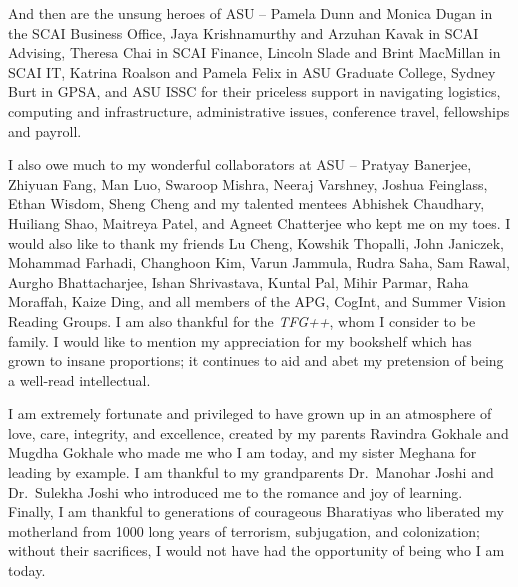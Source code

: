 {\begin{justify}
And then are the unsung heroes of ASU -- Pamela Dunn and Monica Dugan in the SCAI Business Office, Jaya Krishnamurthy and Arzuhan Kavak in SCAI Advising, Theresa Chai in SCAI Finance, Lincoln Slade and Brint MacMillan in SCAI IT, Katrina Roalson and Pamela Felix in ASU Graduate College, Sydney Burt in GPSA, and ASU ISSC for their priceless support in navigating logistics, computing and infrastructure, administrative issues, conference travel, fellowships and payroll.


I also owe much to my wonderful collaborators at ASU -- Pratyay Banerjee, Zhiyuan Fang, Man Luo, Swaroop Mishra, Neeraj Varshney, Joshua Feinglass, Ethan Wisdom, Sheng Cheng and my talented mentees Abhishek Chaudhary, Huiliang Shao, Maitreya Patel, and Agneet Chatterjee who kept me on my toes.
I would also like to thank my friends Lu Cheng, Kowshik Thopalli, John Janiczek, Mohammad Farhadi, Changhoon Kim, Varun Jammula, Rudra Saha, Sam Rawal, Aurgho Bhattacharjee, Ishan Shrivastava, Kuntal Pal, Mihir Parmar, Raha Moraffah, Kaize Ding, and all members of the APG, CogInt, and Summer Vision Reading Groups.
I am also thankful for the \textit{TFG++}, whom I consider to be family.
I would like to mention my appreciation for my bookshelf which has grown to insane proportions;
it continues to aid and abet my pretension of being a well-read intellectual.


I am extremely fortunate and privileged to have grown up in an atmosphere of love, care, integrity, and excellence, created by my parents Ravindra Gokhale and Mugdha Gokhale who made me who I am today, and my sister Meghana for leading by example.
I am thankful to my grandparents Dr.\ Manohar Joshi and Dr.\ Sulekha Joshi who introduced me to the romance and joy of learning.
Finally, I am thankful to generations of courageous Bharatiyas who liberated my motherland from 1000 long years of terrorism, subjugation, and colonization; without their sacrifices, I would not have had the opportunity of being who I am today.
\end{justify}
}